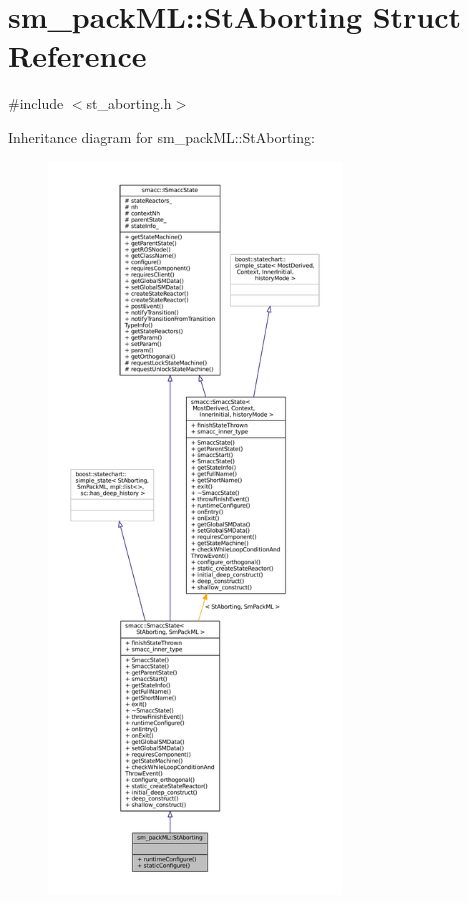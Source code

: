 \hypertarget{structsm__packML_1_1StAborting}{}\section{sm\+\_\+pack\+ML\+:\+:St\+Aborting Struct Reference}
\label{structsm__packML_1_1StAborting}


{\ttfamily \#include $<$st\+\_\+aborting.\+h$>$}



Inheritance diagram for sm\+\_\+pack\+ML\+:\+:St\+Aborting\+:
\nopagebreak
\begin{figure}[H]
\begin{center}
\leavevmode
\includegraphics[height=550pt]{structsm__packML_1_1StAborting__inherit__graph}
\end{center}
\end{figure}



